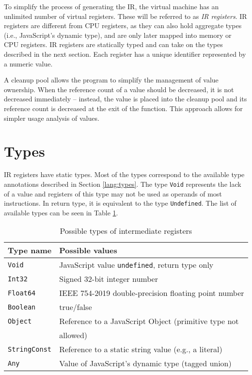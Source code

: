 To simplify the process of generating the IR, the virtual machine has an unlimited number of virtual registers. These will be referred to as \textit{IR registers}. IR registers are different from CPU registers, as they can also hold aggregate types (i.e., JavaScript's dynamic type), and are only later mapped into memory or CPU registers. IR registers are statically typed and can take on the types described in the next section. Each register has a unique identifier represented by a numeric value.

A cleanup pool allows the program to simplify the management of value ownership. When the reference count of a value should be decreased, it is not decreased immediately -- instead, the value is placed into the cleanup pool and its reference count is decreased at the exit of the function. This approach allows for simpler usage analysis of values.


\section{Types}\label{ir:types}

IR registers have static types. Most of the types correspond to the available type annotations described in Section \ref{lang:types}. The type \texttt{Void} represents the lack of a value and registers of this type may not be used as operands of most instructions. In return type, it is equivalent to the type \texttt{Undefined}. The list of available types can be seen in Table \ref{tab:types}.

\begin{table}[H]
    \centering
    \begin{tabular}{l | l}
        Type name            & Possible values                                                \\\hline
        \texttt{Void}        & JavaScript value \texttt{undefined}, return type only          \\
        \texttt{Int32}       & Signed 32-bit integer number                                   \\
        \texttt{Float64}     & IEEE 754-2019 double-precision floating point number           \\
        \texttt{Boolean}     & true/false                                                     \\
        \texttt{Object}      & Reference to a JavaScript Object (primitive type not           \\
                             & allowed)  \\
        \texttt{StringConst} & Reference to a static string value (e.g., a literal)           \\
        \texttt{Any}         & Value of JavaScript's dynamic type (tagged union)
    \end{tabular}
    \caption{Possible types of intermediate registers}
    \label{tab:types}
\end{table}


